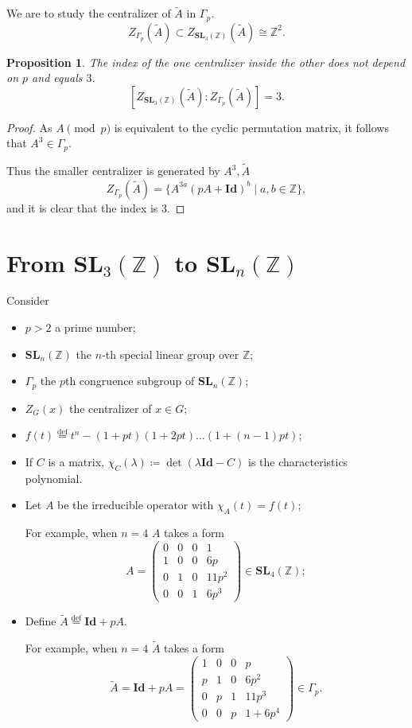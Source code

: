 \documentclass[a4paper]{article}
\newtheorem{Prop}[Thm]{Proposition}
\newcommand{\eqdef}{\stackrel{\mathrm{def}}{=}}
\DeclareMathOperator{\assign}{\coloneqq}        %
\newcommand{\Id}{\mathbf{Id}}        %
\newcommand{\SL}{\mathbf{SL}_3(\mathbb{Z})}        %
\newcommand{\SLp}{\Gamma_p}        %
\newcommand{\SLn}{\mathbf{SL}_n(\mathbb{Z})}        %
\begin{document}
We are to study the centralizer of $\tilde A$ in $\SLp$.
\[
Z_{\SLp}(\tilde A) \subset 
Z_{\SL}(\tilde A) \cong \mathbb{Z}^2
.\] 

\begin{Prop}
	The index of the one centralizer inside the other \emph{does not depend on $p$} and equals $3$.
\[
	[Z_{\SL}(\tilde A) : Z_{\SLp}(\tilde A) ] = 3
.\] 
\end{Prop}
\begin{proof}
As $A \pmod p$ is equivalent to the cyclic permutation matrix, it follows that $A^3 \in \SLp$.

Thus the smaller centralizer is generated by $A^3, \tilde A$
\[
Z_{\SLp}(\tilde A)
= \{ A^{3a} (p A + \Id)^b \mid a, b \in \mathbb{Z} \}
,\] 
and it is clear that the index is $3$.
\end{proof}

\section{From $\SL$ to $\SLn$}

Consider
\begin{itemize}
\item $p > 2$ a prime number;
\item $\SLn$ the $n$-th special linear group over $\mathbb{Z}$;
\item $\SLp$ the $p$th congruence subgroup of $\SLn$;
\item $Z_G(x)$ the centralizer of $x \in G$;
\item $ f(t) \eqdef t^n - (1 + pt) (1 + 2pt) \ldots (1 + (n - 1) p t)$;
\item If $C$ is a matrix, $\chi_C(\lambda) \assign \det(\lambda \Id - C)$ is the characteristics polynomial.
\item Let $A$ be the irreducible operator with $\chi_A(t) = f(t)$; 

For example, when $n = 4$ $A$ takes a form
\begin{equation}
A = 
\begin{pmatrix}
0 & 0 & 0 & 1 \\
1 & 0 & 0 & 6 p \\
0 & 1 & 0 & 11 p^2 \\
0 & 0 & 1 & 6 p^3
\end{pmatrix}
\in {\mathbf{SL}_4(\mathbb{Z})};        %
\end{equation}
\item 
Define $\tilde A \eqdef \Id + p A$.

For example, when $n = 4$ $\tilde A$ takes a form
\begin{equation}
\tilde A = \Id + p A =
\begin{pmatrix}
1 & 0 & 0 & p \\
p & 1 & 0 & 6 p^2 \\
0 & p & 1 & 11 p^3 \\
0 & 0 & p & 1 + 6 p^4
\end{pmatrix}
\in \SLp.
\end{equation}
\end{itemize}
\end{document}
